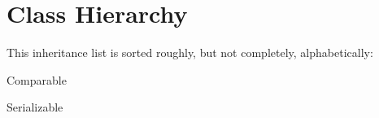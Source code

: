 \section{Class Hierarchy}
This inheritance list is sorted roughly, but not completely, alphabetically\-:\begin{DoxyCompactList}
\item Comparable\begin{DoxyCompactList}
\item {}
\end{DoxyCompactList}
\item {}
\item {}
\item Serializable\begin{DoxyCompactList}
\item {}
\begin{DoxyCompactList}
\item {}
\item {}
\item {}
\end{DoxyCompactList}
\item {}
\end{DoxyCompactList}
\end{DoxyCompactList}

